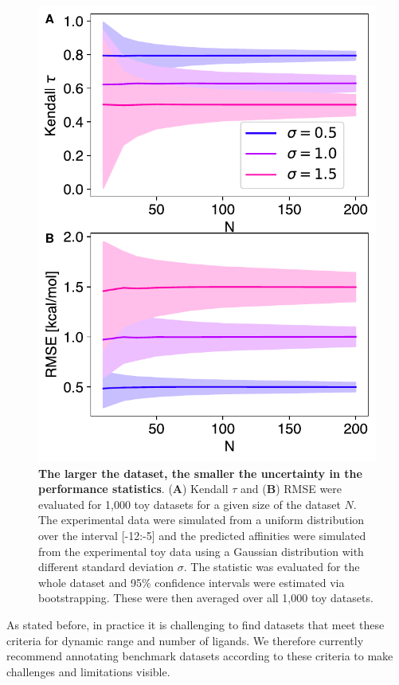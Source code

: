 \documentclass[9pt,bestpractices]{livecoms}
\begin{document}
\begin{figure}[!ht]
    \centering
    \includegraphics[width=0.95\linewidth]{figures/N-CI.pdf}
    \caption{\textbf{The larger the dataset, the smaller the uncertainty in the performance statistics}. (\textbf{A}) Kendall $\tau$ and (\textbf{B}) RMSE were evaluated for 1,000 toy datasets for a given size of the dataset $N$. The experimental data were simulated from a uniform distribution over the interval [-12:-5] and the predicted affinities were simulated from the experimental toy data using a Gaussian distribution with different standard deviation $\sigma$. The statistic was evaluated for the whole dataset and 95\% confidence intervals were estimated via bootstrapping. These were then averaged over all 1,000 toy datasets.}
    \label{fig:N_CI}
\end{figure}

As stated before, in practice it is challenging to find datasets that meet these criteria for dynamic range and number of ligands. We therefore currently recommend annotating benchmark datasets according to these criteria to make challenges and limitations visible.
\end{document}
